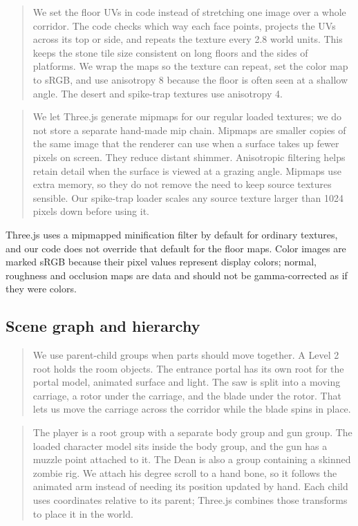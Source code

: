 \documentclass[11pt,a4paper]{article}
\newcommand{\say}[1]{\begin{quote}\small\color{ink}#1\end{quote}}
\begin{document}
\say{We set the floor UVs in code instead of stretching one image over a whole corridor. The code checks which way each face points, projects the UVs across its top or side, and repeats the texture every 2.8 world units. This keeps the stone tile size consistent on long floors and the sides of platforms. We wrap the maps so the texture can repeat, set the color map to sRGB, and use anisotropy 8 because the floor is often seen at a shallow angle. The desert and spike-trap textures use anisotropy 4.}

\say{We let Three.js generate mipmaps for our regular loaded textures; we do not store a separate hand-made mip chain. Mipmaps are smaller copies of the same image that the renderer can use when a surface takes up fewer pixels on screen. They reduce distant shimmer. Anisotropic filtering helps retain detail when the surface is viewed at a grazing angle. Mipmaps use extra memory, so they do not remove the need to keep source textures sensible. Our spike-trap loader scales any source texture larger than 1024 pixels down before using it.}

Three.js uses a mipmapped minification filter by default for ordinary textures, and our code does not override that default for the floor maps. Color images are marked sRGB because their pixel values represent display colors; normal, roughness and occlusion maps are data and should not be gamma-corrected as if they were colors.

\subsection{Scene graph and hierarchy}

\say{We use parent-child groups when parts should move together. A Level 2 root holds the room objects. The entrance portal has its own root for the portal model, animated surface and light. The saw is split into a moving carriage, a rotor under the carriage, and the blade under the rotor. That lets us move the carriage across the corridor while the blade spins in place.}

\say{The player is a root group with a separate body group and gun group. The loaded character model sits inside the body group, and the gun has a muzzle point attached to it. The Dean is also a group containing a skinned zombie rig. We attach his degree scroll to a hand bone, so it follows the animated arm instead of needing its position updated by hand. Each child uses coordinates relative to its parent; Three.js combines those transforms to place it in the world.}
\end{document}
